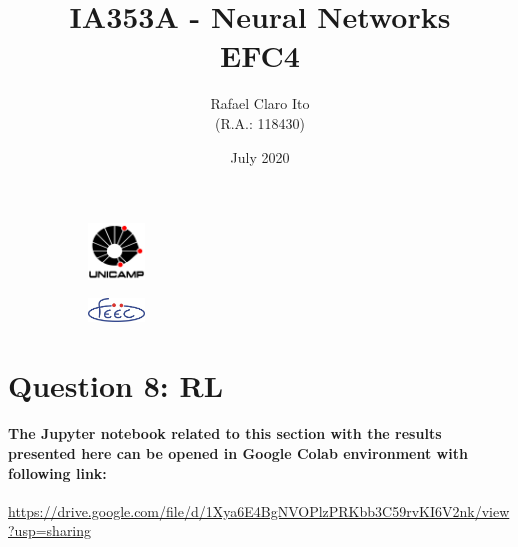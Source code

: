 \documentclass[a4paper]{article}    %
\begin{document}
\begin{figure}
    \centering
    \begin{subfigure}{0.45\textwidth}
        \centering
        \includegraphics[width=1.5cm]{unicamp}
    \end{subfigure}
    \hfill
    \begin{subfigure}{0.45\textwidth}
        \centering
        \includegraphics[width=1.5cm]{feec}
    \end{subfigure}
\end{figure}

\title{
    \vspace{5cm}
    IA353A - Neural Networks\\
    EFC4
    \vspace{1cm}
}
\author{
    Rafael Claro Ito\\
    (R.A.: 118430)
    \vspace{11cm}
}
\date{July 2020}
\maketitle
\newpage

\section*{Question 8: RL}
\addtocounter{section}{8}

\paragraph{The Jupyter notebook related to this section with the results presented here can be opened in Google Colab environment with following link:\\}

\href{https://drive.google.com/file/d/1Xya6E4BgNVOPlzPRKbb3C59rvKI6V2nk/view?usp=sharing}{https://drive.google.com/file/d/1Xya6E4BgNVOPlzPRKbb3C59rvKI6V2nk/view?usp=sharing}
\end{document}
